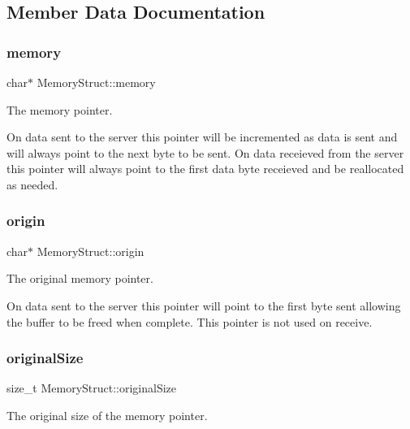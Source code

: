\subsection{Member Data Documentation}
\mbox{\label{structMemoryStruct_a218a6fde0f367d44400542cbe523e943}} 
\subsubsection{\texorpdfstring{memory}{memory}}
{\footnotesize\ttfamily char$\ast$ Memory\+Struct\+::memory}



The memory pointer. 

On data sent to the server this pointer will be incremented as data is sent and will always point to the next byte to be sent. On data receieved from the server this pointer will always point to the first data byte receieved and be reallocated as needed. \mbox{\label{structMemoryStruct_aaad2180b9716f5bf623bf8275f473a95}} 
\subsubsection{\texorpdfstring{origin}{origin}}
{\footnotesize\ttfamily char$\ast$ Memory\+Struct\+::origin}



The original memory pointer. 

On data sent to the server this pointer will point to the first byte sent allowing the buffer to be freed when complete. This pointer is not used on receive. \mbox{\label{structMemoryStruct_a1b96a64b16fc89c7ae010dee990a9bb8}} 
\subsubsection{\texorpdfstring{original\+Size}{originalSize}}
{\footnotesize\ttfamily size\+\_\+t Memory\+Struct\+::original\+Size}



The original size of the memory pointer. 

